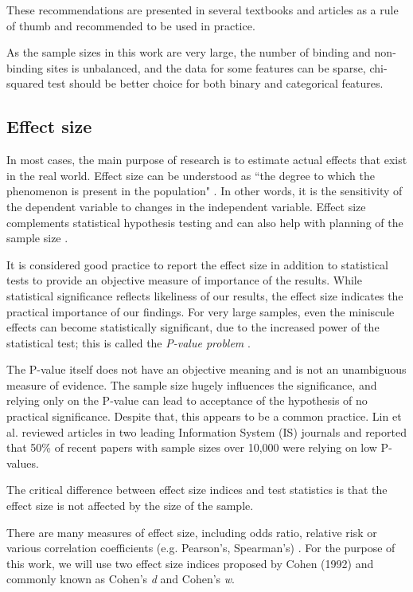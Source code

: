  These recommendations are presented in several textbooks and articles as a rule of thumb \cite{cochranRule} and recommended to be used in practice.

As the sample sizes in this work are very large, the number of binding and non-binding sites is unbalanced, and the data for some features can be sparse, chi-squared test should be better choice for both binary and categorical features.

\subsection{Effect size} \label{s:effectsize}
In most cases, the main purpose of research is to estimate actual effects that exist in the real world. Effect size can be understood as ``the degree to which the phenomenon is present in the population" \cite{cohen_book}. In other words, it is the sensitivity of the dependent variable to changes in the independent variable. Effect size complements statistical hypothesis testing and can also help with planning of the sample size \cite{cohen}.

It is considered good practice to report the effect size in addition to statistical tests to provide an objective measure of importance of the results. While statistical significance reflects likeliness of our results, the effect size indicates the practical importance of our findings. For very large samples, even the miniscule effects can become statistically significant, due to the increased power of the statistical test; this is called the \textit{P-value problem} \cite{pvalueproblem}. 

The P-value itself does not have an objective meaning and is not an unambiguous measure of evidence. The sample size hugely influences the significance, and relying only on the P-value can lead to acceptance of the hypothesis of no practical significance. Despite that, this appears to be a common practice. Lin et al. \cite{pvalueproblem} reviewed articles in two leading Information System (IS) journals and reported that 50\% of recent papers with sample sizes over 10,000 were relying on low P-values.

The critical difference between effect size indices and test statistics is that the effect size is not affected by the size of the sample.

There are many measures of effect size, including odds ratio, relative risk or various correlation coefficients (e.g. Pearson's, Spearman's) \cite{effect_sizes}. For the purpose of this work, we will use two effect size indices proposed by Cohen (1992) \cite{cohen} and commonly known as Cohen's \textit{d} and Cohen's \textit{w}.

